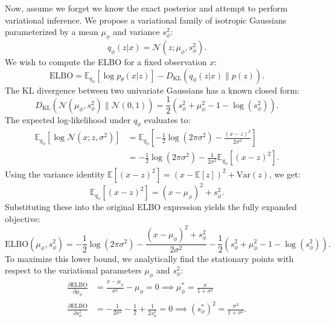 Now, assume we forget we know the exact posterior and attempt to perform variational inference. We propose a variational family of isotropic Gaussians parameterized by a mean $\mu_\phi$ and variance $s_\phi^2$:
\begin{equation}
    q_\phi(z|x) = \mathcal{N}(z; \mu_\phi, s_\phi^2).
\end{equation}
We wish to compute the ELBO for a fixed observation $x$:
\begin{equation}
    \mathrm{ELBO} = \mathbb{E}_{q_\phi}[ \log p_\theta(x|z) ] - D_{\mathrm{KL}}(q_\phi(z|x) \parallel p(z)).
\end{equation}
The KL divergence between two univariate Gaussians has a known closed form:
\begin{equation}
    D_{\mathrm{KL}}(\mathcal{N}(\mu_\phi, s_\phi^2) \parallel \mathcal{N}(0, 1)) = \frac{1}{2}\left( s_\phi^2 + \mu_\phi^2 - 1 - \log(s_\phi^2) \right).
\end{equation}
The expected log-likelihood under $q_\phi$ evaluates to:
\begin{align}
    \mathbb{E}_{q_\phi}[ \log \mathcal{N}(x; z, \sigma^2) ] &= \mathbb{E}_{q_\phi}\left[ -\frac{1}{2}\log(2\pi\sigma^2) - \frac{(x-z)^2}{2\sigma^2} \right] \nonumber \\
    &= -\frac{1}{2}\log(2\pi\sigma^2) - \frac{1}{2\sigma^2} \mathbb{E}_{q_\phi}[ (x-z)^2 ].
\end{align}
Using the variance identity $\mathbb{E}[ (x-z)^2 ] = (x - \mathbb{E}[z])^2 + \mathrm{Var}(z)$, we get:
\begin{equation}
    \mathbb{E}_{q_\phi}[ (x-z)^2 ] = (x - \mu_\phi)^2 + s_\phi^2.
\end{equation}
Substituting these into the original ELBO expression yields the fully expanded objective:
\begin{equation}
    \mathrm{ELBO}(\mu_\phi, s_\phi^2) = -\frac{1}{2}\log(2\pi\sigma^2) - \frac{(x - \mu_\phi)^2 + s_\phi^2}{2\sigma^2} - \frac{1}{2}\left( s_\phi^2 + \mu_\phi^2 - 1 - \log(s_\phi^2) \right).
\end{equation}
To maximize this lower bound, we analytically find the stationary points with respect to the variational parameters $\mu_\phi$ and $s_\phi^2$:
\begin{align}
    \frac{\partial \mathrm{ELBO}}{\partial \mu_\phi} &= \frac{x - \mu_\phi}{\sigma^2} - \mu_\phi = 0 \implies \mu_\phi^* = \frac{x}{1+\sigma^2} \\
    \frac{\partial \mathrm{ELBO}}{\partial s_\phi^2} &= -\frac{1}{2\sigma^2} - \frac{1}{2} + \frac{1}{2s_\phi^2} = 0 \implies (s_\phi^*)^2 = \frac{\sigma^2}{1+\sigma^2}.
\end{align}
